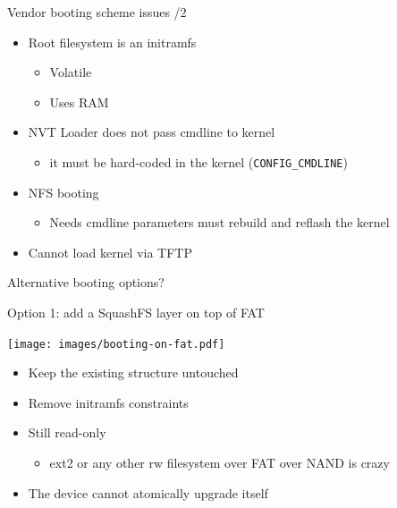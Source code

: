 \documentclass[xetex,table,aspectratio=169]{beamer}
\begin{document}
\begin{frame}{Vendor booting scheme issues /2}
  \begin{itemize}
  \item Root filesystem is an initramfs
    \begin{itemize}
    \item Volatile
    \item Uses RAM
    \end{itemize}
  \item NVT Loader does not pass cmdline to kernel
    \begin{itemize}
    \item it must be hard-coded in the kernel (\texttt{CONFIG\_CMDLINE})
    \end{itemize}
  \item NFS booting
    \begin{itemize}
    \item Needs cmdline parameters \textrightarrow{} must rebuild and
      reflash the kernel
    \end{itemize}
  \item Cannot load kernel via TFTP
  \end{itemize}
\end{frame}

\begin{frame}[standout]
  \begin{center}
    Alternative booting options?
  \end{center}
\end{frame}

\begin{frame}{Option 1: add a SquashFS layer on top of FAT}
  \begin{center}
    \texttt{[image: images/booting-on-fat.pdf]}
  \end{center}
  \begin{itemize}
  \item Keep the existing structure untouched
  \item Remove initramfs constraints
  \item Still read-only
    \begin{itemize}
    \item ext2 or any other rw filesystem over FAT over NAND is crazy
    \end{itemize}
  \item The device cannot atomically upgrade itself
  \end{itemize}
\end{frame}
\end{document}
